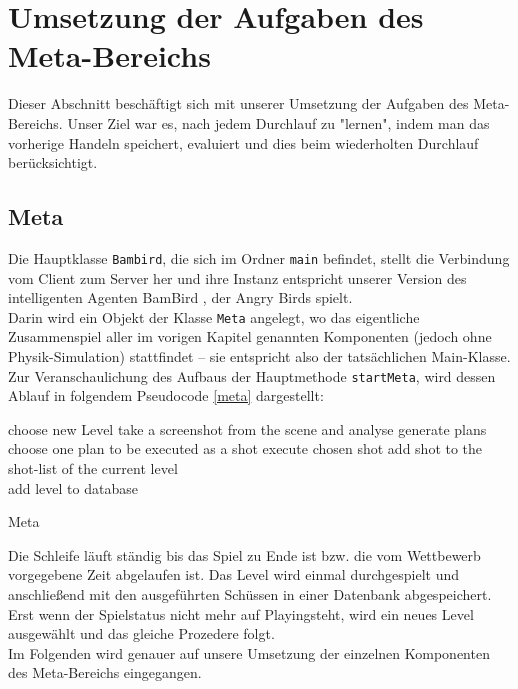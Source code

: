 \section{Umsetzung der Aufgaben des Meta-Bereichs}
Dieser Abschnitt beschäftigt sich mit unserer Umsetzung der Aufgaben des Meta-Bereichs. Unser Ziel war es, nach jedem Durchlauf zu "lernen", indem man das vorherige Handeln speichert, evaluiert und dies beim wiederholten Durchlauf berücksichtigt.

\subsection{Meta}
Die Hauptklasse \texttt{Bambird}, die sich im Ordner \texttt{main} befindet, stellt die Verbindung vom Client zum Server her und ihre Instanz entspricht unserer Version des intelligenten Agenten \glqq BamBird \grqq, der Angry Birds spielt. \\
Darin wird ein Objekt der Klasse \texttt{Meta} angelegt, wo das eigentliche Zusammenspiel aller im vorigen Kapitel genannten Komponenten (jedoch ohne Physik-Simulation) stattfindet -- sie entspricht also der tatsächlichen \glqq Main-Klasse\grqq. Zur Veranschaulichung des Aufbaus der Hauptmethode \texttt{startMeta}, wird dessen Ablauf in folgendem Pseudocode \ref{meta} dargestellt:

\begin{algorithm}[H]
  \begin{algorithmic}[1]
  \Loop
  		\State choose new Level
  	\EndIf
  	\State take a screenshot from the scene and analyse
  	\State generate plans
  	\State choose one plan to be executed as a shot
  	\State execute chosen shot
  	\State add shot to the shot-list of the current level
  	 \\
  		\hspace{2.5em} add level to database
  	\EndIf
  \EndLoop
  \end{algorithmic}
  \caption{Meta \label{meta}}
\end{algorithm}

Die Schleife läuft ständig bis das Spiel zu Ende ist bzw. die vom Wettbewerb vorgegebene Zeit abgelaufen ist. Das Level wird einmal durchgespielt und anschließend mit den ausgeführten Schüssen in einer Datenbank abgespeichert. Erst wenn der Spielstatus nicht mehr auf \glqq Playing\grqq steht, wird ein neues Level ausgewählt und das gleiche Prozedere folgt. \\
Im Folgenden wird genauer auf unsere Umsetzung der einzelnen Komponenten des Meta-Bereichs eingegangen.

